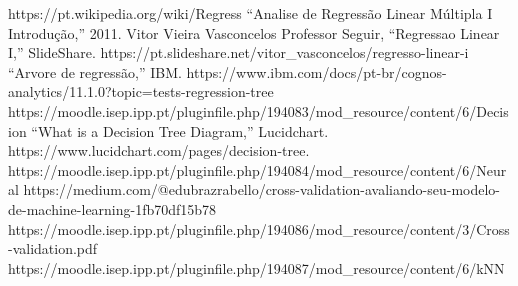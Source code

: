\begin{thebibliography}{00}
 https://pt.wikipedia.org/wiki/Regress%
 “Analise de Regressão Linear Múltipla I Introdução,” 2011.
 Vitor Vieira Vasconcelos Professor Seguir, “Regressao Linear I,” SlideShare. https://pt.slideshare.net/vitor\_vasconcelos/regresso-linear-i
 “Arvore de regressão,” IBM. https://www.ibm.com/docs/pt-br/cognos-analytics/11.1.0?topic=tests-regression-tree
 https://moodle.isep.ipp.pt/pluginfile.php/194083/mod\_resource/content/6/Decision%
 “What is a Decision Tree Diagram,” Lucidchart. https://www.lucidchart.com/pages/decision-tree.
 https://moodle.isep.ipp.pt/pluginfile.php/194084/mod\_resource/content/6/Neural%
 https://medium.com/@edubrazrabello/cross-validation-avaliando-seu-modelo-de-machine-learning-1fb70df15b78
 https://moodle.isep.ipp.pt/pluginfile.php/194086/mod\_resource/content/3/Cross-validation.pdf
 https://moodle.isep.ipp.pt/pluginfile.php/194087/mod\_resource/content/6/kNN%
\end{thebibliography}